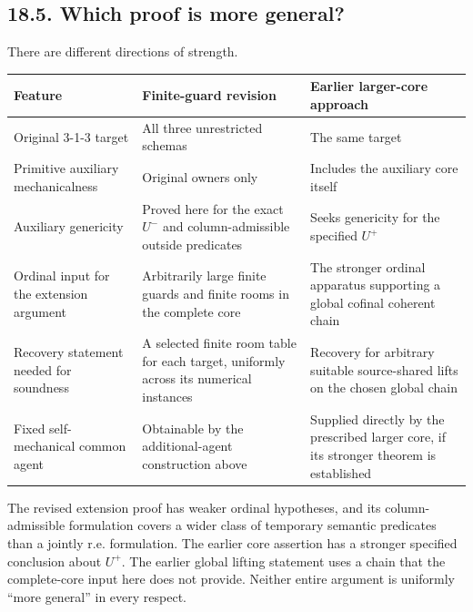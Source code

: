 \documentclass[
  11pt,
  letterpaper,
]{article}
\newcounter{none} %
\begin{document}
\subsection{18.5. Which proof is more
general?}\label{which-proof-is-more-general}

There are different directions of strength.

{\def\LTcaptype{none} %
\begin{longtable}[]{@{}
  >{\raggedright\arraybackslash}p{}
  >{\raggedright\arraybackslash}p{}
  >{\raggedright\arraybackslash}p{}@{}}
\toprule\noalign{}
\begin{minipage}[b]{\linewidth}\raggedright
Feature
\end{minipage} & \begin{minipage}[b]{\linewidth}\raggedright
Finite-guard revision
\end{minipage} & \begin{minipage}[b]{\linewidth}\raggedright
Earlier larger-core approach
\end{minipage} \\
\midrule\noalign{}
\endhead
\bottomrule\noalign{}
\endlastfoot
Original 3-1-3 target & All three unrestricted schemas & The same
target \\
Primitive auxiliary mechanicalness & Original owners only & Includes the
auxiliary core itself \\
Auxiliary genericity & Proved here for the exact \(U^-\) and
column-admissible outside predicates & Seeks genericity for the
specified \(U^+\) \\
Ordinal input for the extension argument & Arbitrarily large finite
guards and finite rooms in the complete core & The stronger ordinal
apparatus supporting a global cofinal coherent chain \\
Recovery statement needed for soundness & A selected finite room table
for each target, uniformly across its numerical instances & Recovery for
arbitrary suitable source-shared lifts on the chosen global chain \\
Fixed self-mechanical common agent & Obtainable by the additional-agent
construction above & Supplied directly by the prescribed larger core, if
its stronger theorem is established \\
\end{longtable}
}

The revised extension proof has weaker ordinal hypotheses, and its
column-admissible formulation covers a wider class of temporary semantic
predicates than a jointly r.e. formulation. The earlier core assertion
has a stronger specified conclusion about \(U^+\). The earlier global
lifting statement uses a chain that the complete-core input here does
not provide. Neither entire argument is uniformly ``more general'' in
every respect.
\end{document}
